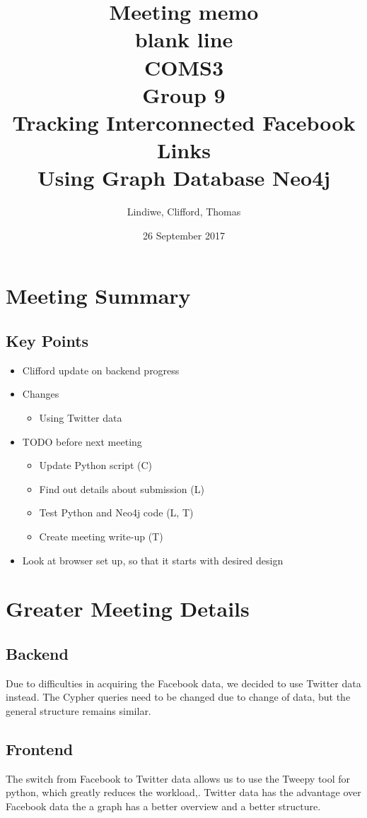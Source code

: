 \documentclass[11pt]{article}
\title{%
Meeting memo\\\large
\color{white} blank line\\
\color{black}
COMS3\\
Group 9\\
Tracking Interconnected Facebook Links\\
Using Graph Database Neo4j}
\date{26 September 2017}
\author{Lindiwe, Clifford, Thomas}
\begin{document}
\maketitle
{}
\newpage
{}
\section{Meeting Summary}
\subsection{Key Points}
\begin{itemize}
\item Clifford update on backend progress
\item Changes
\begin{itemize}
\item Using Twitter data
\end{itemize}
\item TODO before next meeting
\begin{itemize}
\item Update Python script (C)
\item Find out details about submission (L)
\item Test Python and Neo4j code (L, T)
\item Create meeting write-up (T)
\end{itemize}
\item Look at browser set up, so that it starts with desired design
\end{itemize}

\section{Greater Meeting Details}
\subsection{Backend}
Due to difficulties in acquiring the Facebook data, we decided to use Twitter data instead. 
The Cypher queries need to be changed due to change of data, but the general structure remains similar.

\subsection{Frontend}
The switch from Facebook to Twitter data allows us to use the Tweepy tool for python, which greatly reduces the workload,.
Twitter data has the advantage over Facebook data the a graph has a better overview and a better structure. 
\end{document}
